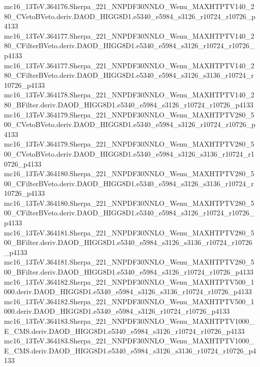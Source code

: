 \begin{scriptsize}
mc16\_13TeV.364176.Sherpa\_221\_NNPDF30NNLO\_Wenu\_MAXHTPTV140\_280\_CVetoBVeto.deriv.DAOD\_HIGG8D1.e5340\_e5984\_s3126\_r10724\_r10726\_p4133 \\
mc16\_13TeV.364177.Sherpa\_221\_NNPDF30NNLO\_Wenu\_MAXHTPTV140\_280\_CFilterBVeto.deriv.DAOD\_HIGG8D1.e5340\_e5984\_s3126\_r10724\_r10726\_p4133 \\
mc16\_13TeV.364177.Sherpa\_221\_NNPDF30NNLO\_Wenu\_MAXHTPTV140\_280\_CFilterBVeto.deriv.DAOD\_HIGG8D1.e5340\_e5984\_s3126\_s3136\_r10724\_r10726\_p4133 \\
mc16\_13TeV.364178.Sherpa\_221\_NNPDF30NNLO\_Wenu\_MAXHTPTV140\_280\_BFilter.deriv.DAOD\_HIGG8D1.e5340\_e5984\_s3126\_r10724\_r10726\_p4133 \\
mc16\_13TeV.364179.Sherpa\_221\_NNPDF30NNLO\_Wenu\_MAXHTPTV280\_500\_CVetoBVeto.deriv.DAOD\_HIGG8D1.e5340\_e5984\_s3126\_r10724\_r10726\_p4133 \\
mc16\_13TeV.364179.Sherpa\_221\_NNPDF30NNLO\_Wenu\_MAXHTPTV280\_500\_CVetoBVeto.deriv.DAOD\_HIGG8D1.e5340\_e5984\_s3126\_s3136\_r10724\_r10726\_p4133 \\
mc16\_13TeV.364180.Sherpa\_221\_NNPDF30NNLO\_Wenu\_MAXHTPTV280\_500\_CFilterBVeto.deriv.DAOD\_HIGG8D1.e5340\_e5984\_s3126\_s3136\_r10724\_r10726\_p4133 \\
mc16\_13TeV.364180.Sherpa\_221\_NNPDF30NNLO\_Wenu\_MAXHTPTV280\_500\_CFilterBVeto.deriv.DAOD\_HIGG8D1.e5340\_e5984\_s3126\_r10724\_r10726\_p4133 \\
mc16\_13TeV.364181.Sherpa\_221\_NNPDF30NNLO\_Wenu\_MAXHTPTV280\_500\_BFilter.deriv.DAOD\_HIGG8D1.e5340\_e5984\_s3126\_s3136\_r10724\_r10726\_p4133 \\
mc16\_13TeV.364181.Sherpa\_221\_NNPDF30NNLO\_Wenu\_MAXHTPTV280\_500\_BFilter.deriv.DAOD\_HIGG8D1.e5340\_e5984\_s3126\_r10724\_r10726\_p4133 \\
mc16\_13TeV.364182.Sherpa\_221\_NNPDF30NNLO\_Wenu\_MAXHTPTV500\_1000.deriv.DAOD\_HIGG8D1.e5340\_e5984\_s3126\_s3136\_r10724\_r10726\_p4133 \\
mc16\_13TeV.364182.Sherpa\_221\_NNPDF30NNLO\_Wenu\_MAXHTPTV500\_1000.deriv.DAOD\_HIGG8D1.e5340\_e5984\_s3126\_r10724\_r10726\_p4133 \\
mc16\_13TeV.364183.Sherpa\_221\_NNPDF30NNLO\_Wenu\_MAXHTPTV1000\_E\_CMS.deriv.DAOD\_HIGG8D1.e5340\_e5984\_s3126\_r10724\_r10726\_p4133 \\
mc16\_13TeV.364183.Sherpa\_221\_NNPDF30NNLO\_Wenu\_MAXHTPTV1000\_E\_CMS.deriv.DAOD\_HIGG8D1.e5340\_e5984\_s3126\_s3136\_r10724\_r10726\_p4133 \\

\end{scriptsize}

